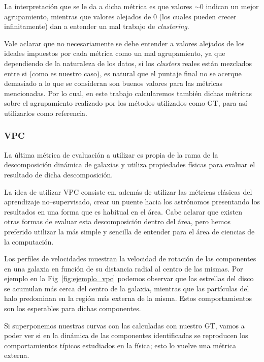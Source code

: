 La interpretación que se le da a dicha métrica es que valores $\sim 0$ indican un mejor agrupamiento, mientras que valores alejados de $0$ (los cuales pueden crecer infinitamente) dan a entender un mal trabajo de \textit{clustering}. 

Vale aclarar que no necesariamente se debe entender a valores alejados de los ideales impuestos por cada métrica como un mal agrupamiento, ya que dependiendo de la naturaleza de los datos, si los \textit{clusters} reales están mezclados entre si (como es nuestro caso), es natural que el puntaje final no se acerque demasiado a lo que se consideran son buenos valores para las métricas mencionadas. Por lo cual, en este trabajo calcularemos también dichas métricas sobre el agrupamiento realizado por los métodos utilizados como \gls{GT}, para así utilizarlos como referencia.

\subsubsection{\acrfull{VPC}}

La última métrica de evaluación a utilizar es propia de la rama de la descomposición dinámica de galaxias y utiliza propiedades físicas para evaluar el resultado de dicha descomposición. 

La idea de utilizar \gls{VPC} \citep{van1957rotation} consiste en, además de utilizar las métricas clásicas del aprendizaje no--supervisado, crear un puente hacia los astrónomos presentando los resultados en una forma que es habitual en el área. Cabe aclarar que existen otras formas de evaluar esta descomposición dentro del área, pero hemos preferido utilizar la más simple y sencilla de entender para el área de ciencias de la computación.

Los perfiles de velocidades muestran la velocidad de rotación de las componentes en una galaxia en función de su distancia radial al centro de las mismas. Por ejemplo en la Fig~\ref{fig:ejemplo_vpc} podemos observar que las estrellas del disco se acumulan más cerca del centro de la galaxia, mientras que las partículas del halo predominan en la región más externa de la misma. Estos comportamientos son los esperables para dichas componentes.

Si superponemos nuestras curvas con las calculadas con nuestro \gls{GT}, vamos a poder ver si en la dinámica de las componentes identificadas se reproducen los comportamientos típicos estudiados en la física; esto lo vuelve una métrica externa.

